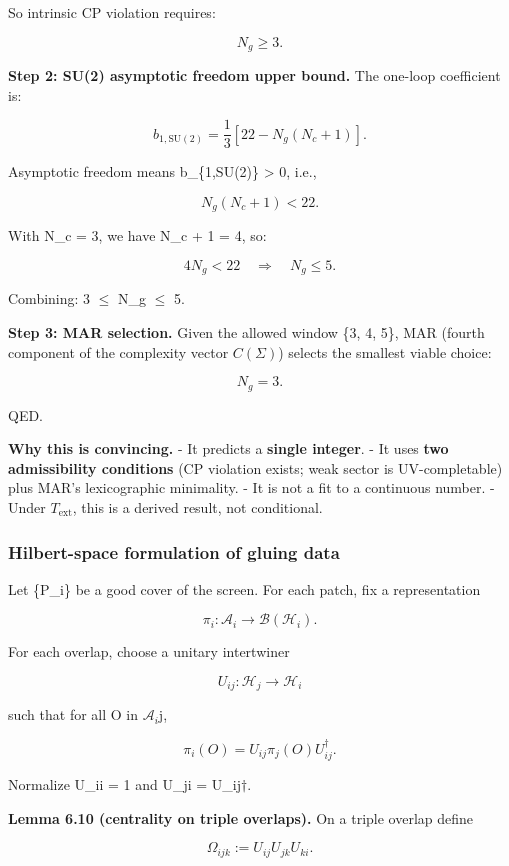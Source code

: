 \documentclass[11pt,a4paper]{article}
\theoremstyle{remark}
\begin{document}
So intrinsic CP violation requires:

\[
N_g \ge 3.
\]

\textbf{Step 2: SU(2) asymptotic freedom upper bound.} The one-loop
coefficient is:

\[
b_{1,\mathrm{SU}(2)} = \frac{1}{3}\left[22 - N_g(N_c + 1)\right].
\]

Asymptotic freedom means b\_\{1,SU(2)\} \textgreater{} 0, i.e.,

\[
N_g(N_c + 1) < 22.
\]

With N\_c = 3, we have N\_c + 1 = 4, so:

\[
4 N_g < 22 \quad \Rightarrow \quad N_g \le 5.
\]

Combining: 3 \ensuremath{\leq} N\_g \ensuremath{\leq} 5.

\textbf{Step 3: MAR selection.} Given the allowed window \{3, 4, 5\}, MAR
(fourth component of the complexity vector \(C(\Sigma)\)) selects the
smallest viable choice:

\[
N_g = 3.
\]

QED.

\textbf{Why this is convincing.}
- It predicts a \textbf{single integer}.
- It uses \textbf{two admissibility conditions} (CP violation exists; weak
sector is UV-completable) plus MAR's lexicographic minimality.
- It is not a fit to a continuous number.
- Under \(T_{\mathrm{ext}}\), this is a derived result, not conditional.

\subsubsection{Hilbert-space formulation of gluing data}\label{hilbert-space-formulation-of-gluing-data}

Let \{P\_i\} be a good cover of the screen. For each patch, fix a representation

\[
\pi_i: \mathcal{A}_i \to \mathcal B(\mathcal H_i).
\]

For each overlap, choose a unitary intertwiner

\[
U_{ij}: \mathcal H_j \to \mathcal H_i
\]

such that for all O in \(\mathcal{A}_i\)j,

\[
\pi_i(O) = U_{ij} \pi_j(O) U_{ij}^\dagger.
\]

Normalize U\_ii = 1 and U\_ji = U\_ij\ensuremath{\dagger}.

\textbf{Lemma 6.10 (centrality on triple overlaps).} On a triple overlap define

\[
\Omega_{ijk} := U_{ij} U_{jk} U_{ki}.
\]
\end{document}
